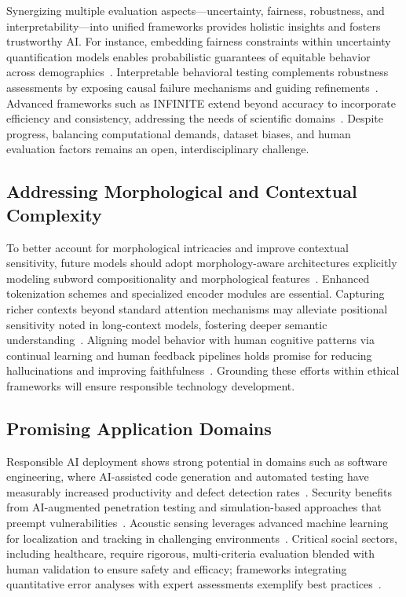 \documentclass[sigconf]{acmart}
\begin{document}
Synergizing multiple evaluation aspects—uncertainty, fairness, robustness, and interpretability—into unified frameworks provides holistic insights and fosters trustworthy AI. For instance, embedding fairness constraints within uncertainty quantification models enables probabilistic guarantees of equitable behavior across demographics~\cite{ref35,ref41}. Interpretable behavioral testing complements robustness assessments by exposing causal failure mechanisms and guiding refinements~\cite{ref36,ref40}. Advanced frameworks such as INFINITE extend beyond accuracy to incorporate efficiency and consistency, addressing the needs of scientific domains~\cite{ref15}. Despite progress, balancing computational demands, dataset biases, and human evaluation factors remains an open, interdisciplinary challenge.

\subsection{Addressing Morphological and Contextual Complexity}

To better account for morphological intricacies and improve contextual sensitivity, future models should adopt morphology-aware architectures explicitly modeling subword compositionality and morphological features~\cite{ref38}. Enhanced tokenization schemes and specialized encoder modules are essential. Capturing richer contexts beyond standard attention mechanisms may alleviate positional sensitivity noted in long-context models, fostering deeper semantic understanding~\cite{ref26}. Aligning model behavior with human cognitive patterns via continual learning and human feedback pipelines holds promise for reducing hallucinations and improving faithfulness~\cite{ref20,ref30}. Grounding these efforts within ethical frameworks will ensure responsible technology development.

\subsection{Promising Application Domains}

Responsible AI deployment shows strong potential in domains such as software engineering, where AI-assisted code generation and automated testing have measurably increased productivity and defect detection rates~\cite{ref15,ref30,ref33}. Security benefits from AI-augmented penetration testing and simulation-based approaches that preempt vulnerabilities~\cite{ref31}. Acoustic sensing leverages advanced machine learning for localization and tracking in challenging environments~\cite{ref38,ref39}. Critical social sectors, including healthcare, require rigorous, multi-criteria evaluation blended with human validation to ensure safety and efficacy; frameworks integrating quantitative error analyses with expert assessments exemplify best practices~\cite{ref31}.
\end{document}
